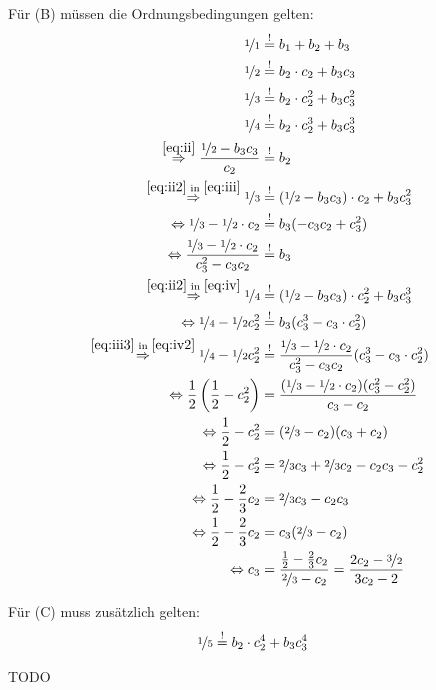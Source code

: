 Für (B) müssen die Ordnungsbedingungen gelten:
\begin{align}
    \nicefrac{1}{1} &\stackrel{!}{=} b_1 + b_2 + b_3\label{eq:i}\\
    \nicefrac{1}{2} &\stackrel{!}{=} b_2 \cdot c_2 + b_3 c_3\label{eq:ii}\\
    \nicefrac{1}{3} &\stackrel{!}{=} b_2 \cdot c_2^2 + b_3 c_3^2\label{eq:iii}\\
    \nicefrac{1}{4} &\stackrel{!}{=} b_2 \cdot c_2^3 + b_3 c_3^3\label{eq:iv}\\
    \stackrel{\ref{eq:ii}}{\Rightarrow} \frac{\nicefrac{1}{2} - b_3 c_3}{c_2}&\stackrel{!}{=} b_2 \label{eq:ii2}\\
    \stackrel{\ref{eq:ii2} \text{ in } \ref{eq:iii}}{\Rightarrow} \nicefrac{1}{3} &\stackrel{!}{=} (\nicefrac{1}{2} - b_3 c_3) \cdot c_2 + b_3 c_3^2\label{eq:iii2}\\
    \Leftrightarrow \nicefrac{1}{3} - \nicefrac{1}{2} \cdot c_2 &\stackrel{!}{=} b_3 (- c_3 c_2 + c_3^2)\\
    \Leftrightarrow \frac{\nicefrac{1}{3} - \nicefrac{1}{2} \cdot c_2}{c_3^2 - c_3 c_2} &\stackrel{!}{=} b_3 \label{eq:iii3}\\
    \stackrel{\ref{eq:ii2} \text{ in } \ref{eq:iv}}{\Rightarrow} \nicefrac{1}{4} &\stackrel{!}{=} (\nicefrac{1}{2} - b_3 c_3) \cdot c_2^2 + b_3 c_3^3\label{eq:iv2}\\
    \Leftrightarrow \nicefrac{1}{4} - \nicefrac{1}{2} c_2^2&\stackrel{!}{=} b_3 (c_3^3 - c_3 \cdot c_2^2) \label{eq:iv2}\\
    \stackrel{\ref{eq:iii3} \text{ in } \ref{eq:iv2}}{\Rightarrow} \nicefrac{1}{4} - \nicefrac{1}{2} c_2^2&\stackrel{!}{=} \frac{\nicefrac{1}{3} - \nicefrac{1}{2} \cdot c_2}{c_3^2 - c_3 c_2} (c_3^3 - c_3 \cdot c_2^2)\\
    \Leftrightarrow \frac{1}{2} \left (\frac{1}{2} - c_2^2 \right ) &= \frac{(\nicefrac{1}{3} - \nicefrac{1}{2} \cdot c_2)(c_3^2 - c_2^2)}{c_3 - c_2}\\
    \Leftrightarrow \frac{1}{2} - c_2^2 &= (\nicefrac{2}{3} - c_2)(c_3 + c_2)\\
    \Leftrightarrow \frac{1}{2} - c_2^2 &= \nicefrac{2}{3} c_3 + \nicefrac{2}{3} c_2 - c_2 c_3 - c_2^2\\
    \Leftrightarrow \frac{1}{2} - \frac{2}{3} c_2 &= \nicefrac{2}{3} c_3- c_2 c_3\\
    \Leftrightarrow \frac{1}{2} - \frac{2}{3} c_2 &= c_3(\nicefrac{2}{3}- c_2)\\
    \Leftrightarrow c_3 &= \frac{\frac{1}{2} - \frac{2}{3} c_2}{\nicefrac{2}{3}- c_2} = \frac{2c_2-\nicefrac{3}{2}}{3c_2 - 2}\\
\end{align}

Für (C) muss zusätzlich gelten:
\begin{align}
    \nicefrac{1}{5} &\stackrel{!}{=} b_2 \cdot c_2^4 + b_3 c_3^4
\end{align}

TODO
